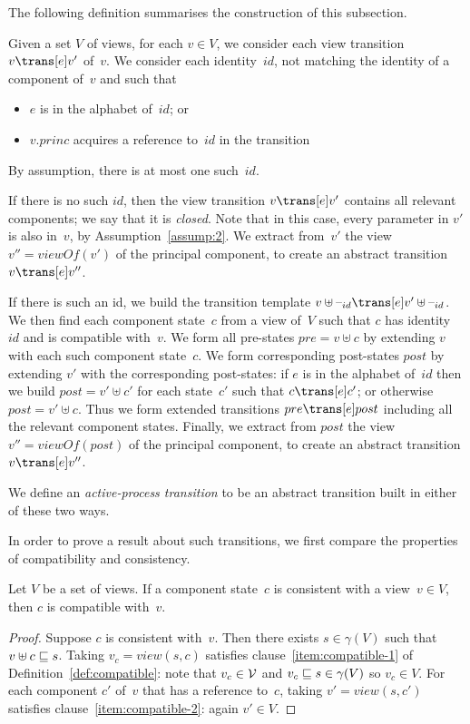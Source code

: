 The following definition summarises the construction of this subsection.
%
\begin{definition}
\label{def:active-process-transition}
Given a set $V$ of views, for each $v \in V$, we consider each view transition
$v \trans[e] v'$ of~$v$.
%
We consider each identity~$id$, not matching the identity of a component
of~$v$ and such that
%
\begin{itemize}
\item $e$ is in the alphabet of~$id$; or

\item $v.princ$ acquires a reference to~$id$ in the transition
\end{itemize}
%
By assumption, there is at most one such~$id$.

If there is no such $id$, then the view transition $v \trans[e] v'$ contains
all relevant components; we say that it is \emph{closed}.  Note that in this
case, every parameter in $v'$ is also in~$v$, by Assumption~\ref{assump:2}.
We extract from~$v'$ the view~$v'' = viewOf(v')$ of the principal component,
to create an abstract transition $v \trans[e] v''$.

If there is such an id, we build the transition template $v \uplus \hole{id}
\trans[e] v' \uplus \hole{id}$.  We then find each component state~$c$ from a
view of~$V$ such that $c$ has identity~$id$ and is compatible with~$v$.  We
form all pre-states $pre = v \uplus c$ by extending $v$ with each such
component state~$c$.  We form corresponding post-states $post$ by extending
$v'$ with the corresponding post-states: if $e$ is in the alphabet of~$id$
then we build $post = v' \uplus c'$ for each state~$c'$ such that $c \trans[e]
c'$; or otherwise $post = v' \uplus c$.  Thus we form extended transitions
$pre \trans[e] post$ including all the relevant component states.  Finally, we
extract from $post$ the view~$v'' = viewOf(post)$ of the principal component,
to create an abstract transition $v \trans[e] v''$.

We define an \emph{active-process transition} to be an abstract transition
built in either of these two ways.
\end{definition}


In order to prove a result about such transitions, we first compare the
properties of compatibility and consistency.
%
\begin{lemma}
\label{lem:consistent-implies-compatible}
Let $V$ be a set of views.
If a component state~$c$ is consistent with a view~$v \in V$, then
$c$ is compatible with~$v$. 
\end{lemma}
%
\begin{proof}
Suppose $c$ is consistent with~$v$.  Then there exists $s \in \gamma(V)$ such
that $v \uplus c \sqsubseteq s$.  Taking $v_c = view(s, c)$ satisfies
clause~\ref{item:compatible-1} of Definition~\ref{def:compatible}: note that
$v_c \in \mathcal{V}$ and $v_c \sqsubseteq s \in \gamma(V)$ so $v_c \in V$.  For each
component $c'$ of~$v$ that has a reference to~$c$, taking $v' = view(s,c')$
satisfies clause~\ref{item:compatible-2}: again $v' \in V$.
\end{proof}

